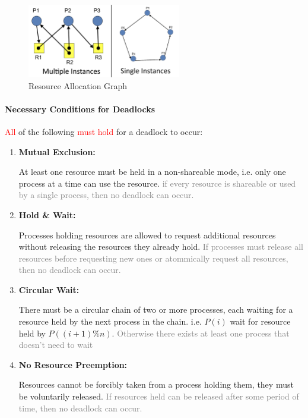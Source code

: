 \documentclass[openany,12pt]{book}
\newcommand{\red}[1]{\textcolor{Red}{#1}}
\newcommand{\gray}[1]{\textcolor{gray}{#1}}
\begin{document}
\begin{figure}[H]
  \centering
  \includegraphics[width=0.6\textwidth]{ResourceGraph.png}
  \caption{Resource Allocation Graph}
  \label{fig:Resource_Allocation_Graph}
\end{figure}


\paragraph{Necessary Conditions for Deadlocks} \red{All} of the following \red{must hold} for a deadlock to occur:
\begin{enumerate}
  \item \textbf{Mutual Exclusion:} \par
        At least one resource must be held in a non-shareable mode, i.e. only one process at a time can use the resource. \gray{if every resource is shareable or used by a single process, then no deadlock can occur.}

  \item \textbf{Hold \& Wait:} \par
        Processes holding resources are allowed to request additional resources without releasing the resources they already hold. \gray{If processes must release all resources before requesting new ones or atommically request all resources, then no deadlock can occur.}

  \item \textbf{Circular Wait:} \par
        There must be a circular chain of two or more processes, each waiting for a resource held by the next process in the chain. i.e. \(P(i)\) wait for resource held by \(P((i+1)\%n)\). \gray{Otherwise there exists at least one process that doesn't need to wait}

  \item \textbf{No Resource Preemption:} \par
        Resources cannot be forcibly taken from a process holding them, they must be voluntarily released. \gray{If resources held can be released after some period of time, then no deadlock can occur.}
\end{enumerate}
\end{document}
